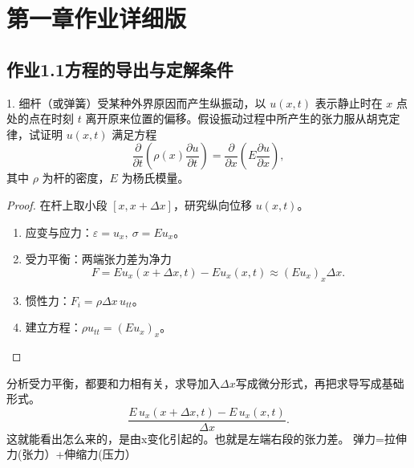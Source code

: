 \chapter{第一章作业详细版}

\section{作业1.1方程的导出与定解条件}

\begin{exercise}
1. 细杆（或弹簧）受某种外界原因而产生纵振动，以 $u(x,t)$ 表示静止时在 $x$ 点处的点在时刻 $t$ 离开原来位置的偏移。假设振动过程中所产生的张力服从胡克定律，试证明 $u(x,t)$ 满足方程
\[
\frac{\partial}{\partial t}\left(\rho(x)\frac{\partial u}{\partial t}\right)
= \frac{\partial}{\partial x}\left(E\frac{\partial u}{\partial x}\right),
\]
其中 $\rho$ 为杆的密度，$E$ 为杨氏模量。

\begin{tcolorbox}[enhanced, breakable,
sidebyside, righthand width=0.33\textwidth,
colback=white, colframe=gray!40,
lefthand ratio=0.65, sharp corners]

\begin{proof}
在杆上取小段 $[x, x+\Delta x]$，研究纵向位移 $u(x,t)$。
\begin{enumerate}[leftmargin=*,itemsep=2pt,topsep=2pt]
  \item 应变与应力：$\varepsilon=u_x,\ \sigma=E u_x$。
  \item 受力平衡：两端张力差为净力
  \[
  F = E u_x(x+\Delta x,t)-E u_x(x,t)
  \approx (E u_x)_x \Delta x.
  \]
  \item 惯性力：$F_i=\rho \Delta x\, u_{tt}$。
  \item 建立方程：$\rho u_{tt}=(E u_x)_x$。
\end{enumerate}
\end{proof}

\tcblower
\small

 \textcolor[HTML]{FF8618}{
分析受力平衡，都要和力相有关，求导加入$\Delta x$写成微分形式，再把求导写成基础形式。}  \[\frac{E\,u_x(x+\Delta x,t)-E\,u_x(x,t)}{\Delta x}.
\] \textcolor[HTML]{FF8618}{
这就能看出怎么来的，是由x变化引起的。也就是左端右段的张力差。
弹力=拉伸力(张力）+伸缩力(压力）
}


\end{tcolorbox}

\end{exercise}
